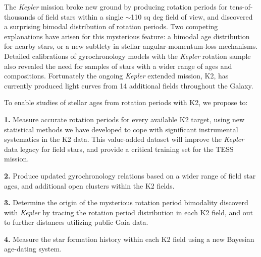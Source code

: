 \documentclass[12pt]{article}
\newcommand{\Kepler}{\textsl{Kepler}\xspace}
\begin{document}
The \Kepler mission broke new ground by producing rotation periods for tens-of-thousands of field stars within a single $\sim$110 sq deg field of view, and discovered a surprising bimodal distribution of rotation periods. Two competing explanations have arisen for this mysterious feature: a bimodal age distribution for nearby stars, or a new subtlety in stellar angular-momentum-loss mechanisms. Detailed calibrations of gyrochronology models with the \Kepler rotation sample also revealed the need for samples of stars with a wider range of ages and compositions. Fortunately the ongoing \Kepler extended mission, K2, has currently produced light curves from 14 additional fields throughout the Galaxy.

To enable studies of stellar ages from rotation periods with K2, we propose to:

{\bf 1.} Measure accurate rotation periods for every available K2 target, using new statistical methods we have developed to cope with significant instrumental systematics in the K2 data. This value-added dataset will improve the \Kepler data legacy for field stars, and provide a critical training set for the TESS mission.

{\bf 2.} Produce updated gyrochronology relations based on a wider range of field star ages, and additional open clusters within the K2 fields.

{\bf 3.} Determine the origin of the mysterious rotation period bimodality discoverd with \Kepler by tracing the rotation period distribution in each K2 field, and out to further distances utilizing public Gaia data.

{\bf 4.} Measure the star formation history within each K2 field using a new Bayesian age-dating system.



\clearpage



\end{document}
